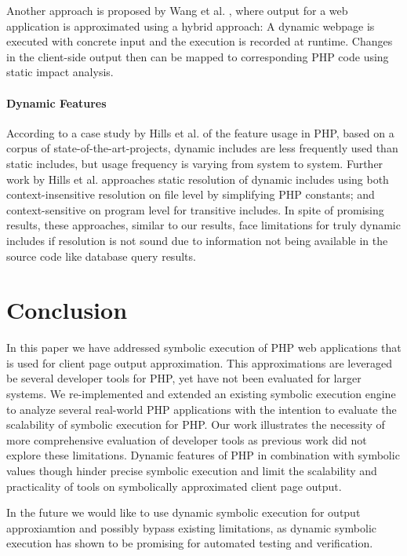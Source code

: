 \documentclass[sigconf]{acmart}
\begin{document}
Another approach is proposed by Wang et al. \cite{wang_automating_2012}, where
output for a web application is approximated using a hybrid approach: A
dynamic webpage is executed with concrete input and the execution is
recorded at runtime. Changes in the client-side output then can be mapped to 
corresponding PHP code using static impact analysis.

\paragraph{Dynamic Features}
According to a case study by Hills et al. \cite{Hills:2013:ESP:2483760.2483786}
of the feature usage in PHP, based on a corpus of state-of-the-art-projects,
dynamic includes are less frequently used than static includes, but usage
frequency is varying from system to system. Further work by Hills et al.
\cite{hills2014static,hills2014php} approaches static resolution of dynamic includes using
both context-insensitive resolution on file level by simplifying PHP constants; and context-sensitive on program level for transitive includes. In spite of
promising results, these approaches, similar to our results, face limitations
for truly dynamic includes if resolution is not sound due to information not
being available in the source code like database query results. 





\section{Conclusion}
In this paper we have addressed symbolic execution of PHP web applications that
is used for client page output approximation. This approximations are leveraged
be several developer tools for PHP, yet have not been evaluated for larger
systems. We re-implemented and extended an existing symbolic execution engine
to analyze several real-world PHP applications with the intention to evaluate
the scalability of symbolic execution for PHP. Our work illustrates the
necessity of more comprehensive evaluation of developer tools as
previous work did not explore these limitations. Dynamic features of PHP in
combination with symbolic values though hinder precise symbolic execution and
limit the scalability and practicality of tools on symbolically approximated
client page output.

In the future we would like to use dynamic symbolic execution for output
approxiamtion and possibly bypass existing limitations, as dynamic symbolic
execution has shown to be promising for automated testing and verification.


 
\end{document}
